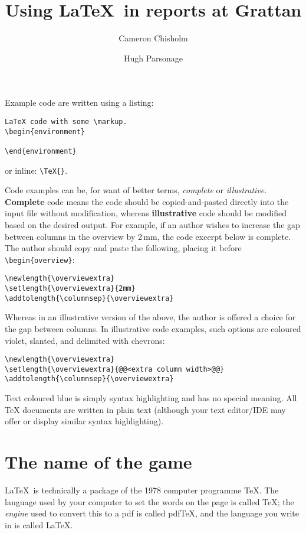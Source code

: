 \documentclass[a4paper,11pt]{scrreprt}\usepackage[]{graphicx}\usepackage[]{color}
\title{{\textrm{Using \LaTeX\ in reports at Grattan}}}
\author{Cameron Chisholm \and Hugh Parsonage}
\let\oldLaTeX\LaTeX
\renewcommand{\LaTeX}{\textrm{\oldLaTeX}}
\newcommand{\defi}[1]{\textbf{\textsf{#1}}}
\begin{document}
\maketitle
\tableofcontents
\newpage
Example code are written using a listing:
\begin{lstlisting}
LaTeX code with some \markup.  
\begin{environment}

\end{environment}
\end{lstlisting}
or inline: \lstinline!\TeX{}!.

Code examples can be, for want of better terms, \emph{complete} or \emph{illustrative}. \defi{Complete} code means the code should be copied-and-pasted directly into the input file without modification, whereas \defi{illustrative} code should be modified based on the desired output. For example, if an author wishes to increase the gap between columns in the overview by 2\,mm, the code excerpt below is complete. The author should copy and paste the following, placing it before \lstinline!\begin{overview}!:
\begin{lstlisting}
\newlength{\overviewextra}
\setlength{\overviewextra}{2mm}
\addtolength{\columnsep}{\overviewextra}
\end{lstlisting}
Whereas in an illustrative version of the above, the author is offered a choice for the gap between columns. In illustrative code examples, such options are coloured violet, slanted, and delimited with chevrons:
\begin{lstlisting}
\newlength{\overviewextra}
\setlength{\overviewextra}{@@<extra column width>@@}
\addtolength{\columnsep}{\overviewextra}
\end{lstlisting}


Text coloured blue is simply syntax highlighting and has no special meaning. All \TeX{} documents are written in plain text (although your text editor/\textsc{IDE} may offer or display similar syntax highlighting). 

\newpage
\chapter{The name of the game}
\LaTeX\ is technically a package of the 1978 computer programme \TeX. 
The language used by your computer to set the words on the page is called \TeX; the \emph{engine} used to convert this to a pdf is called pdf\TeX, and the language you write in is called \LaTeX. 
\end{document}
